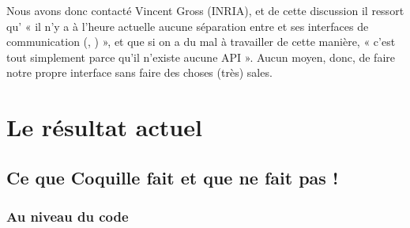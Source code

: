 		Nous avons donc contacté Vincent Gross (INRIA), et de cette discussion il ressort qu' « il n'y a à l'heure actuelle aucune séparation entre \coq et ses interfaces de communication (\coqtop, \coqide) », et que si on a du mal à travailler de cette manière, « c'est tout simplement parce qu'il n'existe aucune API ».
		Aucun moyen, donc, de faire notre propre interface sans faire des choses (très) sales.
				
\section{Le résultat actuel}

    \subsection{Ce que Coquille fait et que \coqide ne fait pas !}
    
        \subsubsection{Au niveau du code}
        
